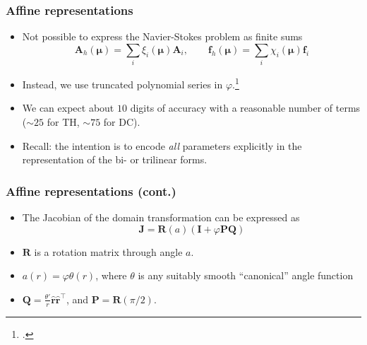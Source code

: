 \documentclass{beamer}
\begin{document}
\begin{frame}
  \frametitle{Affine representations}

  \begin{itemize}
  \item Not possible to express the Navier-Stokes problem as finite sums
    \[
      \bm A_h(\bm \mu) = \textstyle \sum_i \xi_i(\bm \mu) \bm A_i, \qquad
      \bm f_h(\bm \mu) = \textstyle \sum_i \chi_i(\bm \mu) \bm f_i
    \]
  \item Instead, we use truncated polynomial series in $\varphi$.\footcite{Fonn2018fdc}
  \item We can expect about $10$ digits of accuracy with a reasonable number of terms
    (${\sim}25$ for TH, ${\sim}75$ for DC).
  \item Recall: the intention is to encode \emph{all} parameters explicitly in the representation of
    the bi- or trilinear forms.
  \end{itemize}
\end{frame}

\begin{frame}
  \frametitle{Affine representations (cont.)}

  \begin{itemize}
  \item The Jacobian of the domain transformation can be expressed as
    \[
      \bm J = \bm R(a) (\bm I + \varphi \bm P \bm Q)
    \]
  \item $\bm R$ is a rotation matrix through angle $a$.
  \item $a(r) = \varphi \theta(r)$, where $\theta$ is any suitably smooth
    ``canonical'' angle function
    \begin{center}
    \end{center}
  \item $\bm Q = \frac{\theta'}{r} \hat{\bm r} \hat{\bm r}^\intercal$,
    and $\bm P = \bm R(\pi/2)$.
  \end{itemize}
\end{frame}
\end{document}

